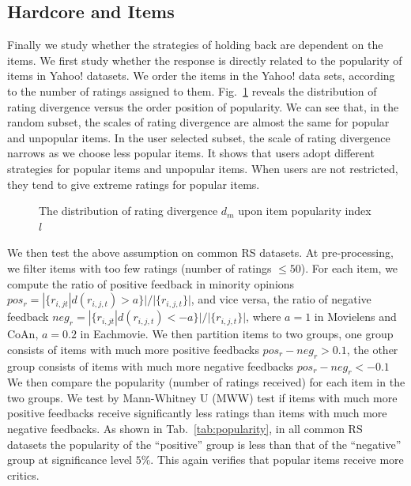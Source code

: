 \documentclass[sigconf]{acmart}
\begin{document}
\subsection{Hardcore and Items}
Finally we study whether the strategies of holding back are dependent on the items. We first study whether the response is directly related to the popularity of items in Yahoo! datasets. We order the items in the Yahoo! data sets, according to the number of ratings assigned to them. Fig.~\ref{fig:popularity} reveals the distribution of rating divergence versus the order position of popularity. We can see that, in the random subset, the scales of rating divergence are almost the same for popular and unpopular items. In the user selected subset, the scale of rating divergence narrows as we choose less popular items. It shows that users adopt different strategies for popular items and unpopular items. When users are  not restricted,  they tend to give extreme ratings for popular items.

\begin{figure}[htbp]
\centering
\centering
{}
\caption{The distribution of rating divergence $d_m$ upon item popularity index $l$}
\label{fig:popularity}
\end{figure}

We then test the above assumption on common RS datasets. At pre-processing, we filter items with too few ratings (number of ratings $\leq 50$). For each item, we compute the ratio of positive feedback in minority opinions $pos_r=|\{r_{i,jt}|d(r_{i,j,t})>a\}|/|\{r_{i,j,t}\}|$, and vice versa, the ratio of negative feedback $neg_r=|\{r_{i,jt}|d(r_{i,j,t})<-a\}|/|\{r_{i,j,t}\}|$, where $a=1$ in Movielens and CoAn, $a=0.2$ in Eachmovie. We then partition items to two groups, one group consists of items with much more positive feedbacks $pos_r-neg_r>0.1$, the other group consists of items with much more negative feedbacks $pos_r-neg_r<-0.1$ We then compare the popularity (number of ratings received) for each item in the two groups. We test by Mann-Whitney U (MWW) test if items with much more positive feedbacks receive significantly less ratings than items with much more negative feedbacks. As shown in Tab.~\ref{tab:popularity}, in all common RS datasets the popularity of the ``positive'' group is less than that of the ``negative'' group at significance level $5\%$. This again verifies that popular items receive more critics. 
\end{document}
